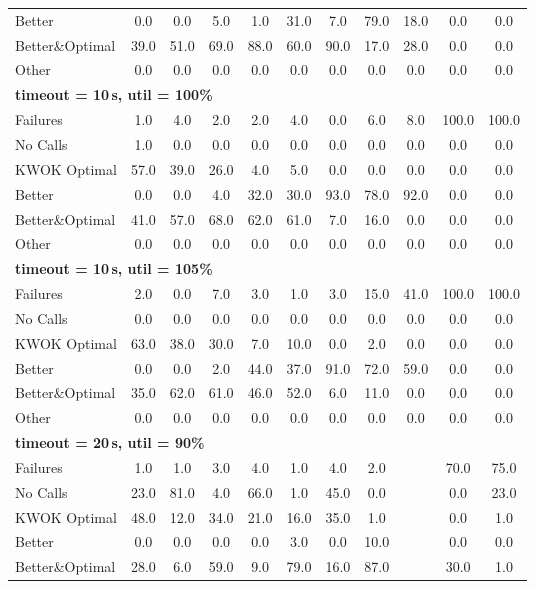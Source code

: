 \begin{tabular}{l cccccccccc}
Better & 0.0 & 0.0 & 5.0 & 1.0 & 31.0 & 7.0 & 79.0 & 18.0 & 0.0 & 0.0 \\
Better\&Optimal & 39.0 & 51.0 & 69.0 & 88.0 & 60.0 & 90.0 & 17.0 & 28.0 & 0.0 & 0.0 \\
Other & 0.0 & 0.0 & 0.0 & 0.0 & 0.0 & 0.0 & 0.0 & 0.0 & 0.0 & 0.0 \\
\midrule
\multicolumn{11}{l}{\textbf{timeout = 10\,s, util = 100\%}} \\
\midrule
Failures & 1.0 & 4.0 & 2.0 & 2.0 & 4.0 & 0.0 & 6.0 & 8.0 & 100.0 & 100.0 \\
No Calls & 1.0 & 0.0 & 0.0 & 0.0 & 0.0 & 0.0 & 0.0 & 0.0 & 0.0 & 0.0 \\
KWOK Optimal & 57.0 & 39.0 & 26.0 & 4.0 & 5.0 & 0.0 & 0.0 & 0.0 & 0.0 & 0.0 \\
Better & 0.0 & 0.0 & 4.0 & 32.0 & 30.0 & 93.0 & 78.0 & 92.0 & 0.0 & 0.0 \\
Better\&Optimal & 41.0 & 57.0 & 68.0 & 62.0 & 61.0 & 7.0 & 16.0 & 0.0 & 0.0 & 0.0 \\
Other & 0.0 & 0.0 & 0.0 & 0.0 & 0.0 & 0.0 & 0.0 & 0.0 & 0.0 & 0.0 \\
\midrule
\multicolumn{11}{l}{\textbf{timeout = 10\,s, util = 105\%}} \\
\midrule
Failures & 2.0 & 0.0 & 7.0 & 3.0 & 1.0 & 3.0 & 15.0 & 41.0 & 100.0 & 100.0 \\
No Calls & 0.0 & 0.0 & 0.0 & 0.0 & 0.0 & 0.0 & 0.0 & 0.0 & 0.0 & 0.0 \\
KWOK Optimal & 63.0 & 38.0 & 30.0 & 7.0 & 10.0 & 0.0 & 2.0 & 0.0 & 0.0 & 0.0 \\
Better & 0.0 & 0.0 & 2.0 & 44.0 & 37.0 & 91.0 & 72.0 & 59.0 & 0.0 & 0.0 \\
Better\&Optimal & 35.0 & 62.0 & 61.0 & 46.0 & 52.0 & 6.0 & 11.0 & 0.0 & 0.0 & 0.0 \\
Other & 0.0 & 0.0 & 0.0 & 0.0 & 0.0 & 0.0 & 0.0 & 0.0 & 0.0 & 0.0 \\
\midrule
\multicolumn{11}{l}{\textbf{timeout = 20\,s, util = 90\%}} \\
\midrule
Failures & 1.0 & 1.0 & 3.0 & 4.0 & 1.0 & 4.0 & 2.0 & \text{--} & 70.0 & 75.0 \\
No Calls & 23.0 & 81.0 & 4.0 & 66.0 & 1.0 & 45.0 & 0.0 & \text{--} & 0.0 & 23.0 \\
KWOK Optimal & 48.0 & 12.0 & 34.0 & 21.0 & 16.0 & 35.0 & 1.0 & \text{--} & 0.0 & 1.0 \\
Better & 0.0 & 0.0 & 0.0 & 0.0 & 3.0 & 0.0 & 10.0 & \text{--} & 0.0 & 0.0 \\
Better\&Optimal & 28.0 & 6.0 & 59.0 & 9.0 & 79.0 & 16.0 & 87.0 & \text{--} & 30.0 & 1.0 \\

\end{tabular}
